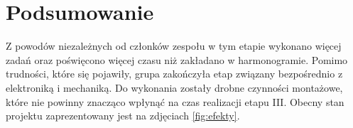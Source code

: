 \documentclass[10pt, a4paper]{article}
\begin{document}
\section{Podsumowanie}
Z powodów niezależnych od członków zespołu w tym etapie wykonano więcej zadań oraz poświęcono więcej czasu niż zakładano w harmonogramie. Pomimo trudności, które się pojawiły, grupa zakończyła etap związany bezpośrednio z elektroniką i mechaniką. Do wykonania zostały drobne czynności montażowe, które nie powinny znacząco wpłynąć na czas realizacji etapu III. Obecny stan projektu zaprezentowany jest na zdjęciach \ref{fig:efekty}.


{}

\nocite{ksiazka1}
\nocite{ksiazka2}
\nocite{gazetka}

\nocite{dok1}
\nocite{dok2}
\nocite{dok3}
\nocite{dok4}
\nocite{dok5}
\nocite{dok6}
\end{document}

